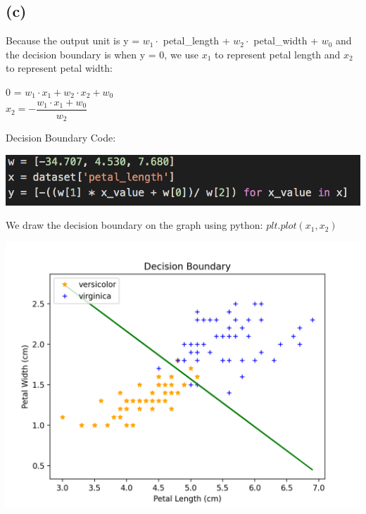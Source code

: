 \documentclass[12pt]{article}
\begin{document}
\subsection*{(c)}
Because the output unit is y = $w_1 \cdot$ petal\_length + $w_2 \cdot$ petal\_width + $w_0$ and the decision boundary is when y = 0, 
we use $x_1$ to represent petal length and $x_2$ to represent petal width: 
\begin{center}
    0 = $w_1 \cdot x_1 + w_2 \cdot x_2 + w_0$ \\ 
    $x_2 = -\dfrac{w_1 \cdot x_1 + w_0}{w_2}$
\end{center}
Decision Boundary Code:
\begin{center}
    \includegraphics[scale=0.50]{fig/ai1c2.png}
\end{center}
We draw the decision boundary on the graph using python: $plt.plot(x_1, x_2)$
\begin{center}
    \includegraphics[scale=0.50]{fig/ai1c.png}
\end{center}
\end{document}
